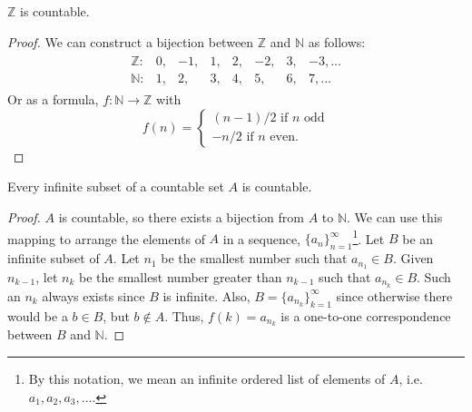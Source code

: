 \begin{lemma}
  $\mathbb{Z}$ is countable. 
\end{lemma}
\begin{proof}
  We can construct a bijection between $\mathbb{Z}$ and $\mathbb{N}$
  as follows:
  \begin{align*}
    \begin{matrix}
      \mathbb{Z}: & 0, & -1, & 1, & 2, & -2, & 3, & -3, ... \\
      \mathbb{N}: & 1, & 2, & 3, & 4, & 5, & 6, & 7,  ...
    \end{matrix}
  \end{align*}
  Or as a formula, $f:\mathbb{N} \rightarrow \mathbb{Z}$ with 
  \[ f(n) = \begin{cases} (n-1)/2 \text{ if } n \text{ odd} \\
    -n/2 \text{ if } n \text{ even}. \end{cases} \]  
\end{proof}

\begin{theorem} \label{thm:countsubset}
  Every infinite subset of a countable set $A$ is countable.
\end{theorem}
\begin{proof}
  $A$ is countable, so there exists a bijection from $A$ to
  $\mathbb{N}$. We can use this mapping to arrange the elements of $A$
  in a sequence, $\{a_{n}\}^\infty_{n=1}$\footnote{By this notation,
    we mean an infinite ordered list of elements of $A$, i.e. $a_1,
    a_2, a_3, ...$.}. Let $B$ be an infinite subset of $A$. Let $n_1$
  be the smallest number such that $a_{n_1} \in B$. Given $n_{k-1}$,
  let $n_k$ be the smallest number greater than $n_{k-1}$ such that
  $a_{n_k} \in B$. Such an $n_k$ always exists since $B$ is
  infinite. Also, $B = \{a_{n_k} \}_{k=1}^\infty$ since otherwise
  there would be a $b \in B$, but $b\not\in A$. Thus, $f(k) = a_{n_k}$
  is a one-to-one correspondence between $B$ and $\mathbb{N}$.
\end{proof}


